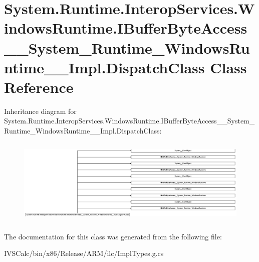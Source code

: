 \hypertarget{class_system_1_1_runtime_1_1_interop_services_1_1_windows_runtime_1_1_i_buffer_byte_access_____sbed3c8e1ff051baeb5120269fb5cb647}{}\section{System.\+Runtime.\+Interop\+Services.\+Windows\+Runtime.\+I\+Buffer\+Byte\+Access\+\_\+\+\_\+\+System\+\_\+\+Runtime\+\_\+\+Windows\+Runtime\+\_\+\+\_\+\+Impl.\+Dispatch\+Class Class Reference}
\label{class_system_1_1_runtime_1_1_interop_services_1_1_windows_runtime_1_1_i_buffer_byte_access_____sbed3c8e1ff051baeb5120269fb5cb647}
Inheritance diagram for System.\+Runtime.\+Interop\+Services.\+Windows\+Runtime.\+I\+Buffer\+Byte\+Access\+\_\+\+\_\+\+System\+\_\+\+Runtime\+\_\+\+Windows\+Runtime\+\_\+\+\_\+\+Impl.\+Dispatch\+Class\+:\begin{figure}[H]
\begin{center}
\leavevmode
\includegraphics[height=4.196185cm]{class_system_1_1_runtime_1_1_interop_services_1_1_windows_runtime_1_1_i_buffer_byte_access_____sbed3c8e1ff051baeb5120269fb5cb647}
\end{center}
\end{figure}


The documentation for this class was generated from the following file\+:\begin{DoxyCompactItemize}
\item 
I\+V\+S\+Calc/bin/x86/\+Release/\+A\+R\+M/ilc/Impl\+Types.\+g.\+cs\end{DoxyCompactItemize}
